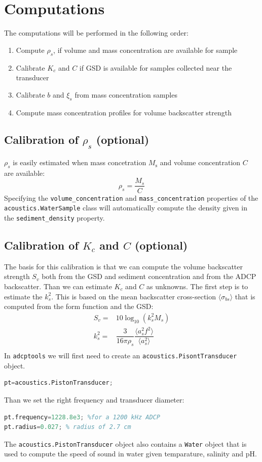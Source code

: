 \documentclass[]{artikel3}
\begin{document}
\section{Computations}
The computations will be performed in the following order:
\begin{enumerate}
  \item Compute $\rho_s$, if volume and mass concentration are available for sample
  \item Calibrate $K_c$ and $C$ if GSD is available for samples collected near the transducer
  \item Calibrate $b$ and $\xi_s$ from mass concentration samples
  \item Compute mass concentration profiles for volume backscatter strength
\end{enumerate}

\subsection{Calibration of $\rho_s$ (optional)}
$\rho_s$ is easily estimated when mass concetration $M_\text{s}$ and volume concentration $C$ are available:
\begin{equation}
  \rho_s=\dfrac{M_s}{C}
\end{equation}
Specifying the \lstinline!volume_concentration! and \lstinline!mass_concentration! properties of the \lstinline!acoustics.WaterSample! class will automatically compute the density given in the \lstinline!sediment_density! property.
\subsection{Calibration of $K_c$ and $C$ (optional)}
The basis for this calibration is that we can compute the volume backscatter strength $S_v$ both from the GSD and sediment concentration and from the ADCP backscatter. Than we can estimate $K_c$ and $C$ as unknowns.
The first step is to estimate the $k_s^2$. This is based on the mean backscatter cross-section $\langle\sigma_{bs}\rangle$ that is computed from the form function and the GSD:
\begin{align*}
  S_v=&10\log_{10}(k_s^2M_s)\\
  k_s^2=&\dfrac{3}{16\pi\rho_s}\dfrac{\langle a_s^2 f^2 \rangle}{\langle a_s^2\rangle}\\
\end{align*}
In \texttt{adcptools} we will first need to create an \texttt{acoustics.PisontTransducer} object.
\begin{lstlisting}[language=Octave]
pt=acoustics.PistonTransducer;
\end{lstlisting}
Than we set the right frequency and transducer diameter:
\begin{lstlisting}[language=Octave]
pt.frequency=1228.8e3; %for a 1200 kHz ADCP
pt.radius=0.027; % radius of 2.7 cm
\end{lstlisting}
The \texttt{acoustics.PistonTransducer} object also contains a \texttt{Water} object that is used to compute the speed of sound in water given temparature, salinity and pH.
\end{document}

